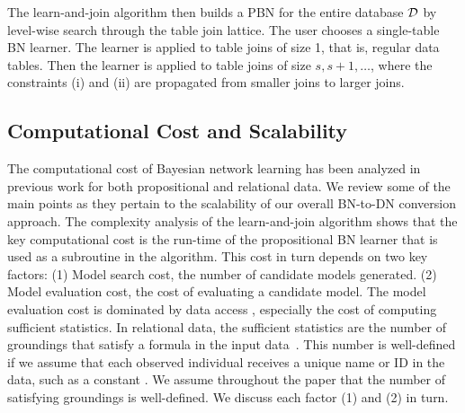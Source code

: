 \documentclass[runningheads,a4paper]{llncs}
\begin{document}
The learn-and-join algorithm then builds a PBN for the entire database $\mathcal{D}$ by level-wise search through the table join lattice. The user chooses a single-table BN learner. The learner is applied to table joins of size 1, that is, regular data tables. Then the learner is applied to table joins of size $s,s+1,\ldots$, where the constraints (i) and (ii) are propagated from smaller joins to larger joins.

\subsection{Computational Cost and Scalability} The computational cost of Bayesian network learning has been analyzed in previous work for both propositional and relational data. We review some of the main points as they pertain to the scalability of our overall BN-to-DN conversion approach.
The complexity analysis of the learn-and-join algorithm \cite{Schulte2012} shows that the key computational cost is the run-time of the propositional BN learner that is used as a subroutine in the algorithm. This cost in turn depends on two key factors: (1) Model search cost, the number of candidate models generated. (2) Model evaluation cost, the cost of evaluating a candidate model. The model evaluation cost is dominated by data access \cite{Moore1998}, especially the cost of computing sufficient statistics. In relational data, the sufficient statistics are the number of groundings that satisfy a formula in the input data~\cite{Friedman99prm,Domingos2009,Schulte2011}. This number is well-defined if we assume that each observed individual receives a unique name or ID in the data, such as a constant \cite{Kimmig2014}.
We assume throughout the paper that the number of satisfying groundings is well-defined. We discuss each factor (1) and (2) in turn. 
\end{document}
